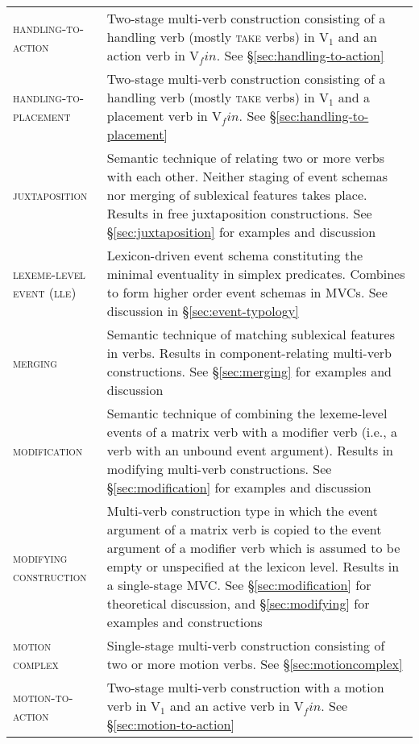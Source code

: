 \begin{footnotesize}
\begin{longtable}{p{4cm} p{8cm}}
\textsc{handling-to-action}  & Two-stage multi-verb construction consisting of a handling verb (mostly \textsc{take} verbs) in V$_1$ and an action verb in V$_fin$. See §\ref{sec:handling-to-action} \\

\textsc{handling-to-placement}  & Two-stage multi-verb construction consisting of a handling verb (mostly \textsc{take} verbs) in V$_1$ and a placement verb in V$_fin$. See §\ref{sec:handling-to-placement} \\
 
\textsc{juxtaposition} & Semantic technique of relating two or more verbs with each other. Neither staging of event schemas nor merging of sublexical features takes place. Results in free juxtaposition constructions. See §\ref{sec:juxtaposition} for examples and discussion \\
 
\textsc{lexeme-level event (lle)}  & Lexicon-driven event schema constituting the minimal eventuality in simplex predicates. Combines to form higher order event schemas in MVCs. See discussion in §\ref{sec:event-typology} \\
 
\textsc{merging}  & Semantic technique of matching sublexical features in verbs. Results in component-relating multi-verb constructions. See §\ref{sec:merging} for examples and discussion \\
 
\textsc{modification} & Semantic technique of combining the lexeme-level events of a matrix verb with a modifier verb (i.e., a verb with an unbound event argument). Results in modifying multi-verb constructions. See §\ref{sec:modification} for examples and discussion \\
 
\textsc {modifying construction}  & Multi-verb construction type in which the event argument of a matrix verb is copied to the event argument of a modifier verb which is assumed to be empty or unspecified at the lexicon level. Results in a single-stage MVC. See §\ref{sec:modification} for theoretical discussion, and §\ref{sec:modifying} for examples and constructions  \\

\textsc{motion complex}  & Single-stage multi-verb construction consisting of two or more motion verbs. See §\ref{sec:motioncomplex} \\

\textsc{motion-to-action}  & Two-stage multi-verb construction with a motion verb in V$_1$ and an active verb in V$_fin$. See §\ref{sec:motion-to-action} \\
 

\end{longtable}
\end{footnotesize}
